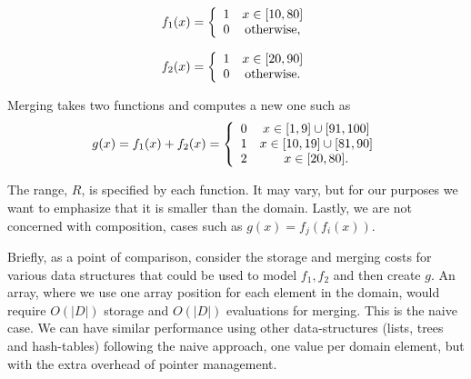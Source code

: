 \documentclass{article}
\begin{document}
\begin{minipage}{.5\linewidth}
\begin{displaymath}
  f_{1}(x) = \left\{
        \begin{array}{c c}
          1 & x \in [10,80] \\
          0 & \text{otherwise,} \\ %
        \end{array}
     \right.
\end{displaymath}
\end{minipage}%
\begin{minipage}{.5\linewidth}
\begin{displaymath}
  f_{2}(x) = \left\{
        \begin{array}{c c}
          1 & x \in [20,90] \\
          0 & \text{otherwise.} \\ %
        \end{array}
     \right.
\end{displaymath}
\end{minipage}
Merging takes two functions and computes a new
one
such as
\begin{displaymath}
  g(x) = f_{1}(x)+f_{2}(x) = \left\{
        \begin{array}{c c}
          0 & x \in [1,9] \cup [91,100] \\
          1 & x \in [10,19] \cup [81,90] \\
          2 & x \in [20,80]. \\
        \end{array}
     \right.
\end{displaymath}

The range, $R$, is specified by each function.
It may vary, but for our purposes we want to emphasize that it is smaller
than the domain.
Lastly, we are not concerned with composition,
cases such as $g(x)=f_{j}(f_{i}(x))$.

Briefly, as a point of comparison,
consider the storage and merging costs for various data
structures that could be used to model $f_{1}, f_{2}$ and then create $g$.
An array, where we use one array position for each element in the domain,
would require $O(|D|)$ storage and $O(|D|)$ evaluations for merging.
This is the naive case.
We can have similar performance using other data-structures
(lists, trees and hash-tables) following the naive approach,
one value per domain element,
but with the extra overhead of pointer management.
\end{document}
